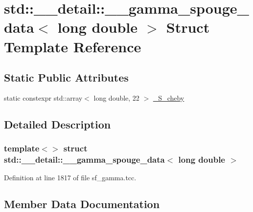\hypertarget{structstd_1_1____detail_1_1____gamma__spouge__data_3_01long_01double_01_4}{}\section{std\+:\+:\+\_\+\+\_\+detail\+:\+:\+\_\+\+\_\+gamma\+\_\+spouge\+\_\+data$<$ long double $>$ Struct Template Reference}
\label{structstd_1_1____detail_1_1____gamma__spouge__data_3_01long_01double_01_4}
\subsection*{Static Public Attributes}
\begin{DoxyCompactItemize}
\item 
static constexpr std\+::array$<$ long double, 22 $>$ \hyperlink{structstd_1_1____detail_1_1____gamma__spouge__data_3_01long_01double_01_4_ad1b0c2af63c28d0eaff89430d1b54589}{\+\_\+\+S\+\_\+cheby}
\end{DoxyCompactItemize}


\subsection{Detailed Description}
\subsubsection*{template$<$$>$\newline
struct std\+::\+\_\+\+\_\+detail\+::\+\_\+\+\_\+gamma\+\_\+spouge\+\_\+data$<$ long double $>$}



Definition at line 1817 of file sf\+\_\+gamma.\+tcc.



\subsection{Member Data Documentation}
\mbox{\label{structstd_1_1____detail_1_1____gamma__spouge__data_3_01long_01double_01_4_ad1b0c2af63c28d0eaff89430d1b54589}} 
